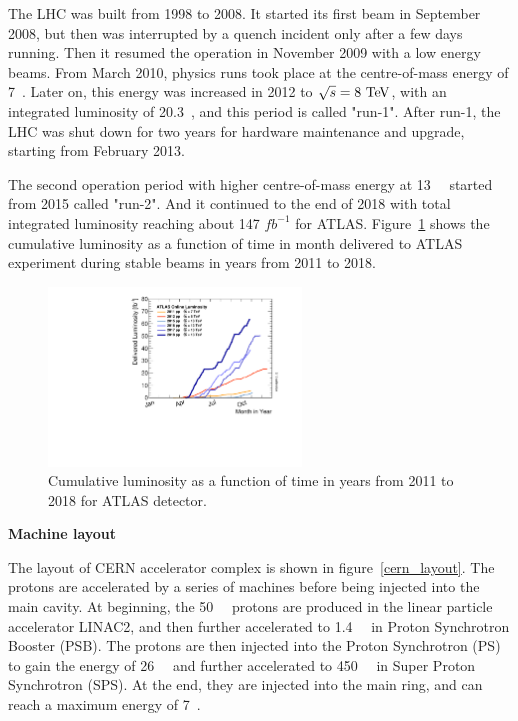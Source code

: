 The LHC was built from 1998 to 2008. 
It started its first beam in September 2008, but then was interrupted by a quench incident only after a few days running.
Then it resumed the operation in November 2009 with a low energy beams.
From March 2010, physics runs took place at the centre-of-mass energy of 7~\tev.
Later on, this energy was increased in 2012 to $\sqrt{s} = 8~\text{Te\kern -0.1em V}$, with an integrated luminosity of 20.3~\ifb, and this period is called "run-1".
After run-1, the LHC was shut down for two years for hardware maintenance and upgrade, starting from February 2013.

The second operation period with higher centre-of-mass energy at 13~\tev~ started from 2015 called "run-2".
And it continued to the end of 2018 with total integrated luminosity reaching about 147 $fb^{-1}$ for ATLAS.
Figure~\ref{fig:lumi_vs_month} shows the cumulative luminosity as a function of time in month delivered to ATLAS experiment during stable beams 
in years from 2011 to 2018.
\begin{figure}[!htb]
  \centering
  \includegraphics[width=0.6\textwidth]{figures/Detector/intlumivsyear.pdf}
  \caption{Cumulative luminosity as a function of time in years from 2011 to 2018 for ATLAS detector.}
  \label{fig:lumi_vs_month}
\end{figure}

\textbf{Machine layout}

The layout of CERN accelerator complex is shown in figure~\ref{cern_layout}.
The protons are accelerated by a series of machines before being injected into the main cavity.
At beginning, the 50~\mev~ protons are produced in the linear particle accelerator LINAC2, 
and then further accelerated to 1.4~\gev~ in Proton Synchrotron Booster (PSB).
The protons are then injected into the Proton Synchrotron (PS) to gain the energy of 26~\gev~ and further accelerated to 450~\gev~ in Super Proton Synchrotron (SPS).
At the end, they are injected into the main ring, and can reach a maximum energy of 7~\tev.


